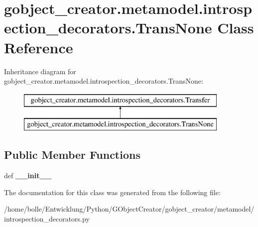\hypertarget{classgobject__creator_1_1metamodel_1_1introspection__decorators_1_1TransNone}{
\section{gobject\_\-creator.metamodel.introspection\_\-decorators.TransNone Class Reference}
\label{classgobject__creator_1_1metamodel_1_1introspection__decorators_1_1TransNone}
}
Inheritance diagram for gobject\_\-creator.metamodel.introspection\_\-decorators.TransNone:\begin{figure}[H]
\begin{center}
\leavevmode
\includegraphics[height=2cm]{classgobject__creator_1_1metamodel_1_1introspection__decorators_1_1TransNone}
\end{center}
\end{figure}
\subsection*{Public Member Functions}
\begin{DoxyCompactItemize}
\item 
\hypertarget{classgobject__creator_1_1metamodel_1_1introspection__decorators_1_1TransNone_ae1e7202866df7d45b83a23936bbe4bc5}{
def {\bfseries \_\-\_\-init\_\-\_\-}}
\label{classgobject__creator_1_1metamodel_1_1introspection__decorators_1_1TransNone_ae1e7202866df7d45b83a23936bbe4bc5}

\end{DoxyCompactItemize}


The documentation for this class was generated from the following file:\begin{DoxyCompactItemize}
\item 
/home/bolle/Entwicklung/Python/GObjectCreator/gobject\_\-creator/metamodel/introspection\_\-decorators.py\end{DoxyCompactItemize}
